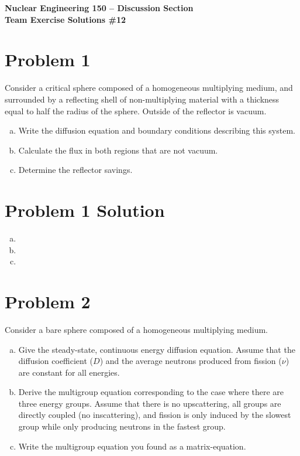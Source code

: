 \documentclass{report}
\begin{document}
\begin{center}
\textbf{\large Nuclear Engineering 150 -- Discussion Section}\\ 
\textbf{Team Exercise Solutions \#12}
\end{center}

\section*{Problem 1}

Consider a critical sphere composed of a homogeneous multiplying medium, and surrounded by a reflecting shell of non-multiplying material with a thickness equal to half the radius of the sphere. Outside of the reflector is vacuum.
\begin{enumerate}[a)]
\item Write the diffusion equation and boundary conditions describing this system.
\item Calculate the flux in both regions that are not vacuum.
\item Determine the reflector savings.
\end{enumerate}



\section*{Problem 1 Solution}

\begin{enumerate}[a)]

\item 
\item
\item

\end{enumerate}


\newpage
\section*{Problem 2}

Consider a bare sphere composed of a homogeneous multiplying medium.
\begin{enumerate}[a)]
\item Give the steady-state, continuous energy diffusion equation. Assume that the diffusion coefficient ($D$) and the average neutrons produced from fission ($\nu$) are constant for all energies.
\item Derive the multigroup equation corresponding to the case where there are three energy groups. Assume that there is no upscattering, all groups are directly coupled (no inscattering), and fission is only induced by the slowest group while only producing neutrons in the fastest group.
\item Write the multigroup equation you found as a matrix-equation.
\end{enumerate}
\end{document}
